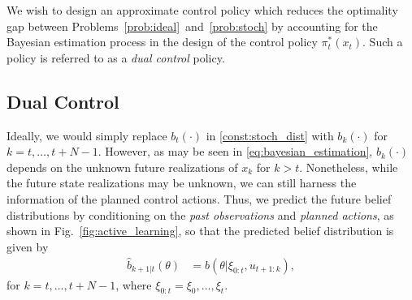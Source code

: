 \documentclass[letterpaper, 10 pt, conference]{IEEEconf}
\begin{document}
We wish to design an approximate control policy which reduces the optimality gap between Problems~\eqref{prob:ideal}~and~\eqref{prob:stoch} by accounting for the Bayesian estimation process in the design of the control policy $\pi^{\ast}_{t}(x_{t})$. 
Such a policy is referred to as a \emph{dual control} policy.

\subsection{Dual Control} \label{sec:proposed_dual_control}

Ideally, we would simply replace $b_{t}(\cdot)$ in \eqref{const:stoch_dist} with $b_{k}(\cdot)$ for $k = t, \dots, t+N-1$. 
However, as may be seen in \eqref{eq:bayesian_estimation}, $b_{k}(\cdot)$ depends on the unknown future realizations of $x_{k}$ for $k > t$.
Nonetheless, while the future state realizations may be unknown, we can still harness the information of the planned control actions.
Thus, we predict the future belief distributions by conditioning on the \emph{past observations} and \emph{planned actions}, as shown in Fig.~\ref{fig:active_learning}, so that the predicted belief distribution is given by
\begin{align}\label{eq:bayesian_approx}
    \hat{b}_{k+1|t}(\theta) &= b(\theta | \xi_{0:t}, u_{t+1:k}),
\end{align}
for $k = t, \dots, t+N-1$, where $\xi_{0:t} = \xi_{0}, \dots, \xi_{t}$.
\end{document}
